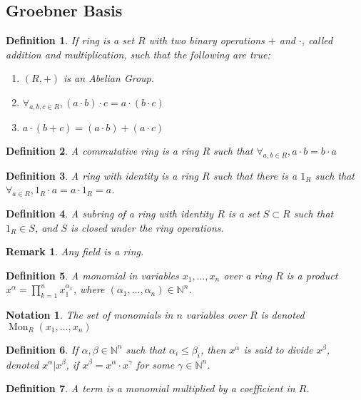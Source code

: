 \documentclass{article}
\theoremstyle{mystyle}
\newtheorem{definition}{Definition}[section]
\newtheorem{remark}{Remark}[section]
\newtheorem{notation}{Notation}[section]
\DeclareMathOperator{\Mon}{Mon}
\begin{document}
\subsection{Groebner Basis}
\begin{definition}
If ring is a set $R$ with two binary operations $+$ and $\cdot$, called addition and multiplication, such that the following are true:
\begin{enumerate}
    \item $(R,+)$ is an Abelian Group.
    \item $\forall_{a,b,c\in R}, (a\cdot b)\cdot c = a\cdot(b\cdot c)$
    \item $a\cdot(b+c) = (a\cdot b)+(a\cdot c)$
\end{enumerate}
\end{definition}
\begin{definition}
A commutative ring is a ring $R$ such that $\forall_{a,b\in R}, a\cdot b = b\cdot a$
\end{definition}
\begin{definition}
A ring with identity is a ring $R$ such that there is a $1_{R}$ such that $\forall_{a\in R}, 1_{R}\cdot a = a\cdot 1_{R} = a$.
\end{definition}
\begin{definition}
A subring of a ring with identity $R$ is a set $S\subset R$ such that $1_{R}\in S$, and $S$ is closed under the ring operations.
\end{definition}
\begin{remark}
Any field is a ring.
\end{remark}
\begin{definition}
A monomial in variables $x_1,\hdots, x_n$ over a ring $R$ is a product $x^\alpha = \prod_{k=1}^{n} x_1^{\alpha_1}$, where $(\alpha_1,\hdots, \alpha_n)\in \mathbb{N}^n$.
\end{definition}
\begin{notation}
The set of monomials in $n$ variables over $R$ is denoted $\Mon_{R}(x_1,\hdots, x_n)$
\end{notation}
\begin{definition}
If $\alpha,\beta \in \mathbb{N}^n$ such that $\alpha_i \leq \beta_i$, then $x^{\alpha}$ is said to divide $x^\beta$, denoted $x^\alpha \vert x^\beta$, if $x^\beta = x^\alpha \cdot x^\gamma$ for some $\gamma \in \mathbb{N}^n$.
\end{definition}
\begin{definition}
A term is a monomial multiplied by a coefficient in $R$.
\end{definition}
\end{document}
